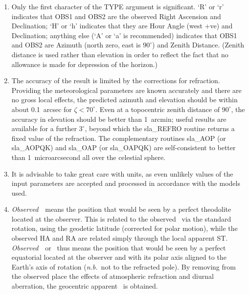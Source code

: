 {
}
\notes
{
 \begin{enumerate}
  \item Only the first character of the TYPE argument is significant.
        `R' or `r' indicates that OBS1 and OBS2 are the observed Right
        Ascension and Declination;  `H' or `h' indicates that they are
        Hour Angle (west +ve) and Declination; anything else (`A' or
        `a' is recommended) indicates that OBS1 and OBS2 are Azimuth
        (north zero, east is $90^{\circ}$) and Zenith Distance.  (Zenith
        distance is used rather than elevation in order to reflect the
        fact that no allowance is made for depression of the horizon.)
  \item The accuracy of the result is limited by the corrections for
        refraction.  Providing the meteorological parameters are
        known accurately and there are no gross local effects, the
        predicted azimuth and elevation should be within about
        0.1~arcsec for $\zeta<70^{\circ}$.  Even
        at a topocentric zenith distance of
        $90^{\circ}$, the accuracy in elevation should be better than
        1~arcmin;  useful results are available for a further
        $3^{\circ}$, beyond which the sla\_REFRO routine returns a
        fixed value of the refraction.  The complementary
        routines sla\_AOP (or sla\_AOPQK) and sla\_OAP (or sla\_OAPQK)
        are self-consistent to better than 1~microarcsecond all over
        the celestial sphere.
  \item It is advisable to take great care with units, as even
        unlikely values of the input parameters are accepted and
        processed in accordance with the models used.
  \item {\it Observed}\, \azel\ means the position that would be seen by a
        perfect theodolite located at the observer.  This is
        related to the observed \hadec\ via the standard rotation, using
        the geodetic latitude (corrected for polar motion), while the
        observed HA and RA are related simply through the local
        apparent ST.  {\it Observed}\, \radec\ or \hadec\ thus means the
        position that would be seen by a perfect equatorial located
        at the observer and with its polar axis aligned to the
        Earth's axis of rotation ({\it n.b.}\ not to the refracted pole).
        By removing from the observed place the effects of
        atmospheric refraction and diurnal aberration, the
        geocentric apparent \radec\ is obtained.

\end{enumerate}}
